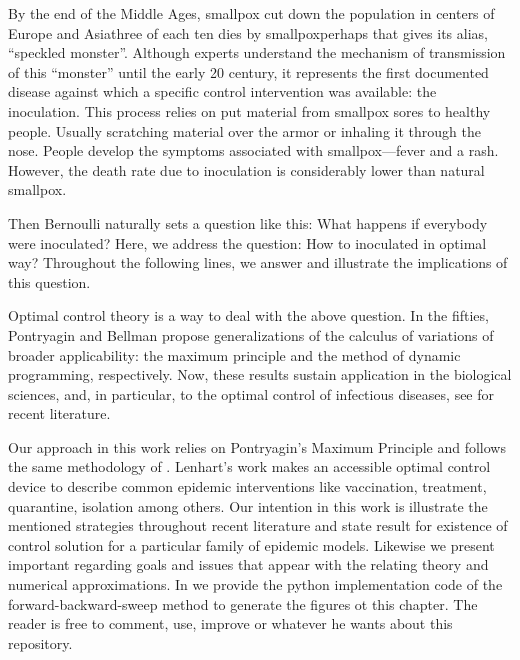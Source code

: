   By the end of the Middle Ages, smallpox cut down the 
population in centers of Europe and Asia\textemdash three of each ten dies by 
smallpox\textemdash perhaps that gives its alias, ``speckled monster''.  
Although experts understand the mechanism of transmission of this  ``monster''
until the early 20  century, it represents the first documented disease
\citep[][]{bernoulli1760essai, bradley1971smallpox, Foppa2017} against which a
specific control intervention was available: the inoculation. This process
relies on put material from smallpox sores to healthy people. Usually scratching
material over the armor or inhaling it through the nose. People develop the
symptoms associated with smallpox---fever and a rash. However, the death rate
due to inoculation is considerably lower than natural smallpox.

  Then Bernoulli naturally sets a question like this: What happens if everybody
were inoculated? Here, we address the question: How to inoculated in optimal
way? Throughout the following lines, we answer and illustrate the
implications of this question. 

  Optimal control theory is a way to deal with the above question.  In the
fifties, Pontryagin and Bellman propose generalizations of the calculus of
variations of broader applicability:  the maximum principle and the method of
dynamic programming, respectively. Now, these results sustain application in the
biological sciences, and, in particular, to the optimal control
of infectious diseases, see  \cite{Yu2018,Lahrouz2018,Jang2018,Cai2017b}
for recent literature.

  Our approach in this work relies on Pontryagin's Maximum
Principle \cite{pontryagin1962} and follows the same methodology of
\citet{lenhart2007optimal}. Lenhart's work makes an accessible optimal control
device to describe common epidemic interventions like vaccination, treatment,
quarantine, isolation among others. Our intention in this work is illustrate
the mentioned strategies throughout recent literature and state result for
existence of control solution for a particular family of epidemic models.
Likewise we present  important regarding goals and issues that appear with the
relating theory and numerical approximations. In \cite{python_repo} we provide 
the python implementation code of the forward-backward-sweep method  to generate
the figures ot this chapter. The reader is free to comment, use, improve or 
whatever he wants about this repository.


























